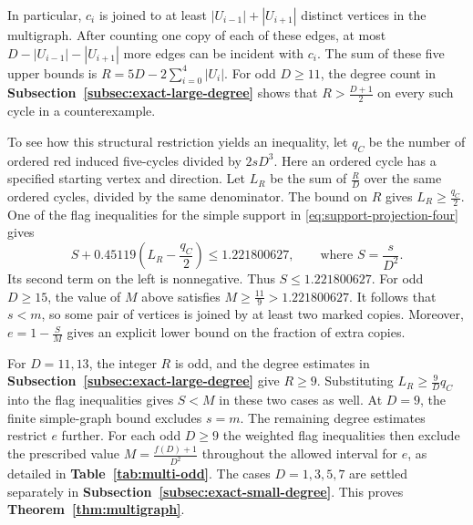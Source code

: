 In particular, $c_i$ is joined to at least $|U_{i-1}|+|U_{i+1}|$
distinct vertices in the multigraph. After counting one copy of each
of these edges, at most $D-|U_{i-1}|-|U_{i+1}|$ more edges can be
incident with $c_i$. The sum of these five upper bounds is
$R=5D-2\sum_{i=0}^4|U_i|$. For odd $D\geq11$, the degree count in
\textbf{Subsection~\ref{subsec:exact-large-degree}} shows that $R>\frac{D+1}{2}$ on
every such cycle in a counterexample.

To see how this structural restriction yields an inequality, let
$q_C$ be the number of ordered red induced five-cycles divided by
$2sD^3$. Here an ordered cycle has a specified starting vertex and
direction. Let $L_R$ be the sum of $\frac{R}{D}$ over the same
ordered cycles, divided by the same denominator. The bound on $R$
gives $L_R\geq\frac{q_C}{2}$. One of the flag inequalities for the
simple support in \eqref{eq:support-projection-four} gives
\[
 S+0.45119\left(L_R-\frac{q_C}{2}\right)\leq 1.221800627,
 \qquad\text{where }S=\frac{s}{D^2}.
\]
Its second term on the left is nonnegative. Thus
$S\leq1.221800627$. For odd $D\geq15$, the value of $M$ above
satisfies $M\geq\frac{11}{9}>1.221800627$. It follows that $s<m$,
so some pair of vertices is joined by at least two marked copies.
Moreover, $e=1-\frac{S}{M}$ gives an explicit lower bound on the
fraction of extra copies.

For $D=11,13$, the integer $R$ is odd, and the degree estimates
in \textbf{Subsection~\ref{subsec:exact-large-degree}} give $R\geq9$. Substituting
$L_R\geq\frac{9}{D}q_C$ into the flag inequalities gives $S<M$
in these two cases as well. At $D=9$, the finite simple-graph
bound excludes $s=m$. The remaining degree estimates restrict $e$
further. For each odd $D\geq9$ the weighted flag inequalities then
exclude the prescribed value $M=\frac{f(D)+1}{D^2}$ throughout the
allowed interval for $e$, as detailed in
\textbf{Table~\ref{tab:multi-odd}}. The cases $D=1,3,5,7$ are
settled separately in \textbf{Subsection~\ref{subsec:exact-small-degree}}. This proves
\textbf{Theorem~\ref{thm:multigraph}}.

